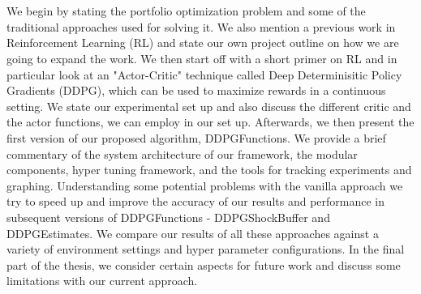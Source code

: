 

\makeatletter

\chapter{\abstractname}
We begin by stating the portfolio optimization problem and some of the traditional approaches used for solving it. We also mention a previous work in Reinforcement Learning (RL) and state our own project outline on how we are going to expand the work. We then start off with a short primer on RL and in particular look at an "Actor-Critic"  technique called Deep Determinisitic Policy Gradients (DDPG), which can be used to maximize rewards in a continuous setting. We state our experimental set up and also discuss  the different critic and the actor functions, we can employ in our set up. Afterwards, we then present the first version of our proposed algorithm, DDPGFunctions. We  provide a brief commentary of the system architecture of our framework, the modular components, hyper tuning framework, and the tools for tracking experiments and graphing. Understanding some potential problems with the vanilla approach we try to speed up and improve the accuracy of our results and performance in subsequent versions of DDPGFunctions - DDPGShockBuffer and DDPGEstimates. We compare our results of all these approaches against a variety of environment settings and hyper parameter configurations. In the final part of the thesis, we consider certain aspects for future work and discuss some limitations with our current approach.

\makeatletter
{}
{\renewcommand{\abstractname}{Abstract}}
